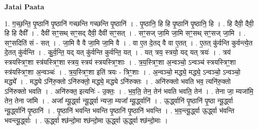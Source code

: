 \documentclass[17pt]{extarticle}
\begin{document}
\textbf{Jatai Paata} \newline

1. ग॒च्छ॒न्ति॒ पृ॒ष्ठानि॑ पृ॒ष्ठानि॑ गच्छन्ति गच्छन्ति पृ॒ष्ठानि॑ । . पृ॒ष्ठानि॒ हि हि पृ॒ष्ठानि॑ पृ॒ष्ठानि॒ हि । . हि दैवी॒ दैवी॒ हि हि दैवी᳚ । . दैवी॑ सꣳ॒॒सथ् सꣳ॒॒सद् दैवी॒ दैवी॑ सꣳ॒॒सत् । . सꣳ॒॒सज् जा॒मि जा॒मि सꣳ॒॒सथ् सꣳ॒॒सज् जा॒मि । . सꣳ॒॒सदिति॑ सं - सत् । . जा॒मि वै वै जा॒मि जा॒मि वै । . वा ए॒त दे॒तद् वै वा ए॒तत् । . ए॒तत् कु॑र्वन्ति कुर्वन्त्ये॒त दे॒तत् कु॑र्वन्ति । . कु॒र्व॒न्ति॒ यद् यत् कु॑र्वन्ति कुर्वन्ति॒ यत् । . यत् त्रय॒ स्त्रयो॒ यद् यत् त्रयः॑ । . त्रय॑ स्त्रयस्त्रिꣳ॒॒शा स्त्र॑यस्त्रिꣳ॒॒शा स्त्रय॒ स्त्रय॑ स्त्रयस्त्रिꣳ॒॒शाः । . त्र॒य॒स्त्रिꣳ॒॒शा अ॒न्वञ्चो॒ ऽन्वञ्च॑ स्त्रयस्त्रिꣳ॒॒शा स्त्र॑यस्त्रिꣳ॒॒शा अ॒न्वञ्चः॑ । . त्र॒य॒स्त्रिꣳ॒॒शा इति॑ त्रयः - त्रिꣳ॒॒शाः । . अ॒न्वञ्चो॒ मद्ध्ये॒ मद्ध्ये॒ ऽन्वञ्चो॒ ऽन्वञ्चो॒ मद्ध्ये᳚ । . मद्ध्ये ऽनि॑रु॒क्तो ऽनि॑रुक्तो॒ मद्ध्ये॒ मद्ध्ये ऽनि॑रुक्तः । . अनि॑रुक्तो भवति भव॒ त्यनि॑रु॒क्तो ऽनि॑रुक्तो भवति । . अनि॑रुक्त॒ इत्यनिः॑ - उ॒क्तः॒ । . भ॒व॒ति॒ तेन॒ तेन॑ भवति भवति॒ तेन॑ । . तेना जा॒ म्यजा॑मि॒ तेन॒ तेना जा॑मि । . अजा᳚ म्यू॒र्द्ध्वा न्यू॒र्द्ध्वा न्यजा॒ म्यजा᳚ म्यू॒र्द्ध्वानि॑ । . ऊ॒र्द्ध्वानि॑ पृ॒ष्ठानि॑ पृ॒ष्ठा न्यू॒र्द्ध्वा न्यू॒र्द्ध्वानि॑ पृ॒ष्ठानि॑ । . पृ॒ष्ठानि॑ भवन्ति भवन्ति पृ॒ष्ठानि॑ पृ॒ष्ठानि॑ भवन्ति । . भ॒व॒न्त्यू॒र्द्ध्वा ऊ॒र्द्ध्वा भ॑वन्ति भवन्त्यू॒र्द्ध्वाः । . ऊ॒र्द्ध्वा श्छ॑न्दो॒मा श्छ॑न्दो॒मा ऊ॒र्द्ध्वा ऊ॒र्द्ध्वा श्छ॑न्दो॒माः । \newline
\end{document}

